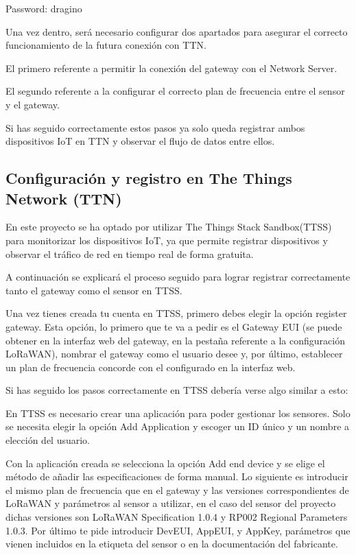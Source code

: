 Password: dragino

Una vez dentro, será necesario configurar dos apartados para asegurar el correcto funcionamiento de la futura conexión con TTN.

El primero referente a permitir la conexión del gateway con el Network Server.


El segundo referente a la configurar el correcto plan de frecuencia entre el sensor y el gateway.

  
Si has seguido correctamente estos pasos ya solo queda registrar ambos dispositivos IoT en TTN y observar el flujo de datos entre ellos.


\subsection{Configuración y registro en The Things Network (TTN) }
En este proyecto se ha optado por utilizar The Things Stack Sandbox(TTSS) para monitorizar los dispositivos IoT, ya que permite registrar dispositivos y observar el tráfico de red en tiempo real de forma gratuita.

A continuación se explicará el proceso seguido para lograr registrar correctamente tanto el gateway como el sensor en TTSS.

Una vez tienes creada tu cuenta en TTSS, primero debes elegir la opción register gateway. Esta opción, lo primero que te va a pedir es el Gateway EUI (se puede obtener en la interfaz web del gateway, en la pestaña referente a la configuración LoRaWAN), nombrar el gateway como el usuario desee y, por último, establecer un plan de frecuencia concorde con el configurado en la interfaz web. 

Si has seguido los pasos correctamente en TTSS debería verse algo similar a esto:


En TTSS es necesario crear una aplicación para poder gestionar los sensores. Solo se necesita elegir la opción Add Application  y escoger un ID único y un nombre a elección del usuario. 

Con la aplicación creada se selecciona la opción Add end device y se elige el método de añadir las especificaciones de forma manual. Lo siguiente es introducir el mismo plan de frecuencia que en el gateway y las versiones correspondientes de LoRaWAN y parámetros al sensor a utilizar, en el caso del sensor del proyecto dichas versiones son 
LoRaWAN Specification 1.0.4 y 
RP002 Regional Parameters 1.0.3. Por último te pide introducir  DevEUI, AppEUI, y AppKey, parámetros que vienen incluidos en la etiqueta del sensor o en la documentación del fabricante.

